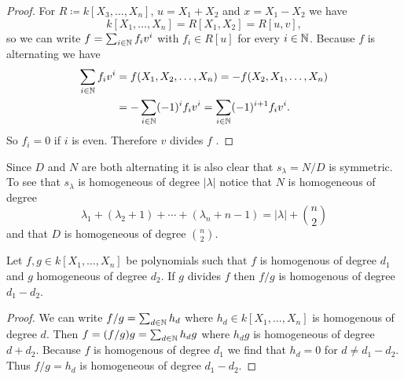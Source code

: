 \begin{expl}[]
\begin{proof}
  For $R \coloneqq k[X_3, \dotsc, X_n]$, $u = X_1 + X_2$ and $x = X_1 - X_2$ we have
  \[
   k[X_1, \dotsc, X_n] = R[X_1, X_2] = R[u,v],
  \]
  so we can write $f = \sum_{i \in \mathbb{N}} f_i v^i$ with $f_i \in R[u]$ for every $i \in \mathbb{N}$. Because $f$ is alternating we have
  \begin{align*}
   \sum_{i \in \mathbb{N}} f_i v^i
   &= f(X_1, X_2, \dotsc, X_n)
   = -f(X_2, X_1, \dotsc, X_n) \\
   &= - \sum_{i \in \mathbb{N}} (-1)^i f_i v^i
   = \sum_{i \in \mathbb{N}} (-1)^{i+1} f_i v^i.
  \end{align*}
  So $f_i = 0$ if $i$ is even. Therefore $v$ divides $f$ .
 \end{proof}
 Since $D$ and $N$ are both alternating it is also clear that $s_\lambda = N/D$ is symmetric. To see that $s_\lambda$ is homogeneous of degree $|\lambda|$ notice that $N$ is homogeneous of degree
 \[
  \lambda_1 + (\lambda_2 + 1) + \dotsb + (\lambda_n + n-1) = |\lambda| + \binom{n}{2}
 \]
 and that $D$ is homogeneous of degree $\binom{n}{2}$.
 \begin{claim}
  Let $f, g \in k[X_1, \dotsc, X_n]$ be polynomials such that $f$ is homogenous of degree $d_1$ and $g$ homogeneous of degree $d_2$. If $g$ divides $f$ then $f/g$ is homogenous of degree $d_1 - d_2$.
 \end{claim}
 \begin{proof}
  We can write $f/g = \sum_{d \in \mathbb{N}} h_d$ where $h_d \in k[X_1, \dotsc, X_n]$ is homogenous of degree $d$. Then $f = (f/g)g = \sum_{d \in \mathbb{N}} h_d g$ where $h_d g$ is homogeneous of degree $d + d_2$. Because $f$ is homogenous of degree $d_1$ we find that $h_d = 0$ for $d \neq d_1 - d_2$. Thus $f/g = h_d$ is homogeneous of degree $d_1 - d_2$.
 \end{proof}
\end{expl}


